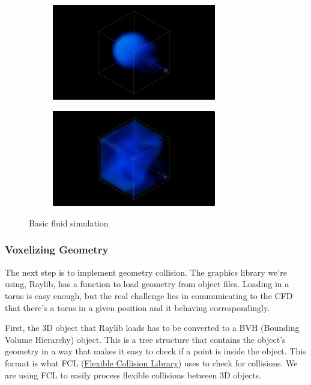 \documentclass[a4paper,12pt]{article}
\begin{document}
\begin{figure}[H]
    \centering
    \begin{subfigure}[t]{0.45\textwidth}
        \centering
        \includegraphics[height=1.65in]{resources/core1.png}
    \end{subfigure}
    \hfill
    \begin{subfigure}[t]{0.45\textwidth}
        \centering
        \includegraphics[height=1.65in]{resources/core2.png}
    \end{subfigure}
	\caption{Basic fluid simulation}
\end{figure}

\subsubsection{Voxelizing Geometry}
The next step is to implement geometry collision. The graphics library we're using,
Raylib, has a function to load geometry from object files. Loading in a torus is
easy enough, but the real challenge lies in communicating to the CFD that there's
a torus in a given position and it behaving correspondingly.

First, the 3D object that Raylib loads has to be converted to a BVH (Bounding Volume
Hierarchy) object. This is a tree structure that contains the object's geometry in
a way that makes it easy to check if a point is inside the object. This format
is what FCL (\href{https://github.com/flexible-collision-library/fcl}{Flexible Collision Library})
uses to check for collisions. We are using FCL to easily process flexible
collisions between 3D objects.
\end{document}
